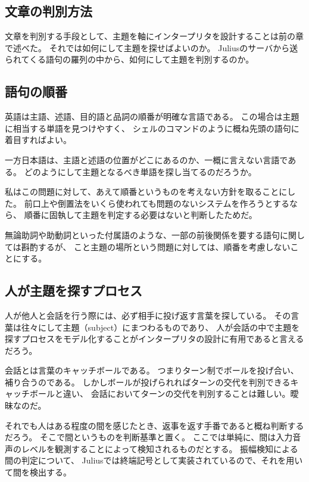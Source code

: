 \documentclass{jsarticle}
\begin{document}
\begin{multicols}{2}
\section{文章の判別方法}

文章を判別する手段として、主題を軸にインタープリタを設計することは前の章で述べた。
それでは如何にして主題を探せばよいのか。
Juliusのサーバから送られてくる語句の羅列の中から、如何にして主題を判別するのか。

\subsection{語句の順番}

英語は主語、述語、目的語と品詞の順番が明確な言語である。
この場合は主題に相当する単語を見つけやすく、
シェルのコマンドのように概ね先頭の語句に着目すればよい。

一方日本語は、主語と述語の位置がどこにあるのか、一概に言えない言語である。
どのようにして主題となるべき単語を探し当てるのだろうか。

私はこの問題に対して、あえて順番というものを考えない方針を取ることにした。
前口上や倒置法をいくら使われても問題のないシステムを作ろうとするなら、
順番に固執して主題を判定する必要はないと判断したためだ。

無論助詞や助動詞といった付属語のような、一部の前後関係を要する語句に関しては斟酌するが、
こと主題の場所という問題に対しては、順番を考慮しないことにする。

\subsection{人が主題を探すプロセス}

人が他人と会話を行う際には、必ず相手に投げ返す言葉を探している。
その言葉は往々にして主題（subject）にまつわるものであり、
人が会話の中で主題を探すプロセスをモデル化することがインタープリタの設計に有用であると言えるだろう。

会話とは言葉のキャッチボールである。
つまりターン制でボールを投げ合い、補り合うのである。
しかしボールが投げられればターンの交代を判別できるキャッチボールと違い、
会話においてターンの交代を判別することは難しい。曖昧なのだ。

それでも人はある程度の間を感じたとき、返事を返す手番であると概ね判断するだろう。
そこで間というものを判断基準と置く。
ここでは単純に、間は入力音声のレベルを観測することによって検知されるものだとする。
振幅検知による間の判定について、
Juliusでは終端記号として実装されているので、それを用いて間を検出する。


\end{multicols}
\end{document}
